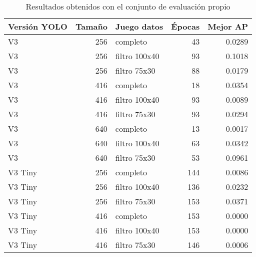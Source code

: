 \begin{table}[H]
	\centering
	\begin{tabular}{lrlrr}
		\toprule
		Versión YOLO &  Tamaño &    Juego datos &  Épocas &  Mejor AP \\
		\midrule
		V3      &     256 &       completo &      43 &    0.0289 \\
		V3      &     256 &  filtro 100x40 &      93 &    0.1018 \\
		V3      &     256 &   filtro 75x30 &      88 &    0.0179 \\
		V3      &     416 &       completo &      18 &    0.0354 \\
		V3      &     416 &  filtro 100x40 &      93 &    0.0089 \\
		V3      &     416 &   filtro 75x30 &      93 &    0.0294 \\
		V3      &     640 &       completo &      13 &    0.0017 \\
		V3      &     640 &  filtro 100x40 &      63 &    0.0342 \\
		V3      &     640 &   filtro 75x30 &      53 &    0.0961 \\
		V3 Tiny &     256 &       completo &     144 &    0.0086 \\
		V3 Tiny &     256 &  filtro 100x40 &     136 &    0.0232 \\
		V3 Tiny &     256 &   filtro 75x30 &     153 &    0.0371 \\
		V3 Tiny &     416 &       completo &     153 &    0.0000 \\
		V3 Tiny &     416 &  filtro 100x40 &     153 &    0.0000 \\
		V3 Tiny &     416 &   filtro 75x30 &     146 &    0.0006 \\
		\bottomrule
	\end{tabular}
	\caption{Resultados obtenidos con el conjunto de evaluación propio}
	\label{tab:evaluationcustom}
\end{table}